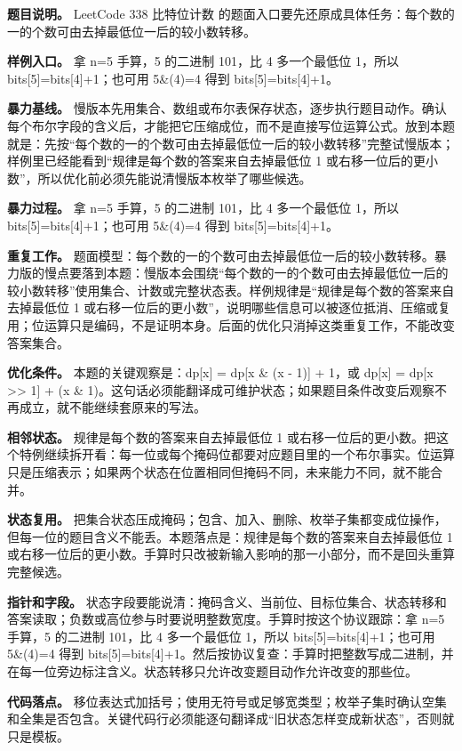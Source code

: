 \textbf{题目说明。} LeetCode 338 比特位计数 的题面入口要先还原成具体任务：每个数的一的个数可由去掉最低位一后的较小数转移。

\textbf{样例入口。} 拿 n=5 手算，5 的二进制 101，比 4 多一个最低位 1，所以 bits[5]=bits[4]+1；也可用 5\&(4)=4 得到 bits[5]=bits[4]+1。

\textbf{暴力基线。} 慢版本先用集合、数组或布尔表保存状态，逐步执行题目动作。确认每个布尔字段的含义后，才能把它压缩成位，而不是直接写位运算公式。放到本题就是：先按“每个数的一的个数可由去掉最低位一后的较小数转移”完整试慢版本；样例里已经能看到“规律是每个数的答案来自去掉最低位 1 或右移一位后的更小数”，所以优化前必须先能说清慢版本枚举了哪些候选。

\textbf{暴力过程。} 拿 n=5 手算，5 的二进制 101，比 4 多一个最低位 1，所以 bits[5]=bits[4]+1；也可用 5\&(4)=4 得到 bits[5]=bits[4]+1。

\textbf{重复工作。} 题面模型：每个数的一的个数可由去掉最低位一后的较小数转移。暴力版的慢点要落到本题：慢版本会围绕“每个数的一的个数可由去掉最低位一后的较小数转移”使用集合、计数或完整状态表。样例规律是“规律是每个数的答案来自去掉最低位 1 或右移一位后的更小数”，说明哪些信息可以被逐位抵消、压缩或复用；位运算只是编码，不是证明本身。后面的优化只消掉这类重复工作，不能改变答案集合。

\textbf{优化条件。} 本题的关键观察是：dp[x] = dp[x \& (x - 1)] + 1，或 dp[x] = dp[x >> 1] + (x \& 1)。这句话必须能翻译成可维护状态；如果题目条件改变后观察不再成立，就不能继续套原来的写法。

\textbf{相邻状态。} 规律是每个数的答案来自去掉最低位 1 或右移一位后的更小数。把这个特例继续拆开看：每一位或每个掩码位都要对应题目里的一个布尔事实。位运算只是压缩表示；如果两个状态在位置相同但掩码不同，未来能力不同，就不能合并。

\textbf{状态复用。} 把集合状态压成掩码；包含、加入、删除、枚举子集都变成位操作，但每一位的题目含义不能丢。本题落点是：规律是每个数的答案来自去掉最低位 1 或右移一位后的更小数。手算时只改被新输入影响的那一小部分，而不是回头重算完整候选。

\textbf{指针和字段。} 状态字段要能说清：掩码含义、当前位、目标位集合、状态转移和答案读取；负数或高位参与时要说明整数宽度。手算时按这个协议跟踪：拿 n=5 手算，5 的二进制 101，比 4 多一个最低位 1，所以 bits[5]=bits[4]+1；也可用 5\&(4)=4 得到 bits[5]=bits[4]+1。然后按协议复查：手算时把整数写成二进制，并在每一位旁边标注含义。状态转移只允许改变题目动作允许改变的那些位。

\textbf{代码落点。} 移位表达式加括号；使用无符号或足够宽类型；枚举子集时确认空集和全集是否包含。关键代码行必须能逐句翻译成“旧状态怎样变成新状态”，否则就只是模板。

